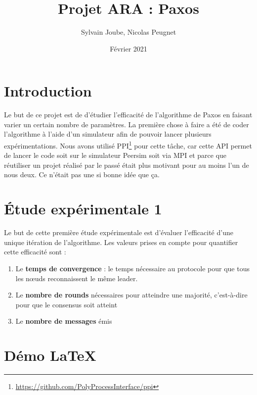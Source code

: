 \documentclass[french]{article}
\title{Projet ARA : Paxos}
\date{Février 2021}
\author{Sylvain Joube, Nicolas Peugnet}
\begin{document}
\maketitle

\tableofcontents

\section{Introduction}

Le but de ce projet est de d'étudier l'efficacité de l'algorithme de Paxos en faisant varier un certain nombre de paramètres.
La première chose à faire a été de coder l'algorithme à l'aide d'un simulateur afin de pouvoir lancer plusieurs expérimentations.
Nous avons utilisé PPI\footnote{\url{https://github.com/PolyProcessInterface/ppi}} pour cette tâche,
car cette API permet de lancer le code soit sur le simulateur Peersim soit via MPI et parce que réutiliser un projet réalisé par le passé était plus motivant pour au moins l'un de nous deux.
Ce n'était pas une si bonne idée que ça.

\section{Étude expérimentale 1}

Le but de cette première étude expérimentale est d'évaluer l'efficacité d'une unique itération de l'algorithme.
Les valeurs prises en compte pour quantifier cette efficacité sont :

\begin{enumerate}
	\item Le \textbf{temps de convergence} : le temps nécessaire au protocole pour que tous les nœuds reconnaissent le même leader.
	\item Le \textbf{nombre de rounds} nécessaires pour atteindre une majorité, c’est-à-dire pour que le consensus soit atteint
	\item Le \textbf{nombre de messages} émis
\end{enumerate}













\section{Démo \LaTeX}
\end{document}
